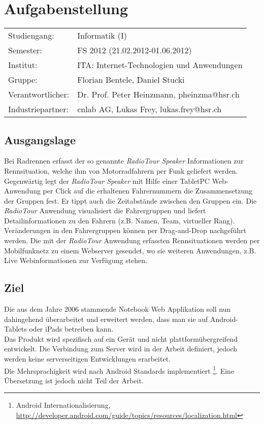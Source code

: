 \chapter*{Aufgabenstellung}

\begin{tabular}{ll}
Studiengang: & Informatik (I)\\
Semester: & FS 2012 (21.02.2012-01.06.2012)\\
Institut: & ITA: Internet-Technologien und Anwendungen\\
Gruppe: & Florian Bentele, Daniel Stucki\\
Verantwortlicher: & Dr. Prof. Peter Heinzmann, pheinzma@hsr.ch\\
Industriepartner: & cnlab AG, Lukas Frey, lukas.frey@hsr.ch

\end{tabular}

\section*{Ausgangslage}
Bei Radrennen erfasst der so genannte \textit{RadioTour Speaker} Informationen zur Rennsituation, welche ihm von Motorradfahrern per Funk geliefert werden. Gegenwärtig legt der \textit{RadioTour Speaker} mit Hilfe einer TabletPC Web-Anwendung per Click auf die erhaltenen Fahrernummern die Zusammensetzung der Gruppen fest. Er tippt auch die Zeitabstände zwischen den Gruppen ein. Die \textit{RadioTour} Anwendung  visualisiert die Fahrergruppen und liefert Detailinformationen zu den Fahrern (z.B. Namen, Team, virtueller Rang). Veränderungen in den Fahrergruppen können per Drag-and-Drop nachgeführt werden. Die mit der \textit{RadioTour} Anwendung erfassten Rennsituationen werden per Mobilfunknetz zu einem Webserver gesendet, wo sie weiteren Anwendungen, z.B. Live Webinformationen zur Verfügung stehen.

\section*{Ziel}
Die aus dem Jahre 2006 stammende Notebook Web Applikation soll nun dahingehend überarbeitet und erweitert werden, dass man sie auf Android-Tablets oder iPads betreiben kann.
\\
Das Produkt wird spezifisch auf ein Gerät und nicht plattformübergreifend entwickelt. Die Verbindung zum Server wird in der Arbeit definiert, jedoch werden keine serverseitigen Entwicklungen erarbeitet.
\\
Die Mehrsprachigkeit wird nach Android Standards implementiert \footnote{Android Internationalisierung, \url{http://developer.android.com/guide/topics/resources/localization.html}}. Eine Übersetzung ist jedoch nicht Teil der Arbeit.

